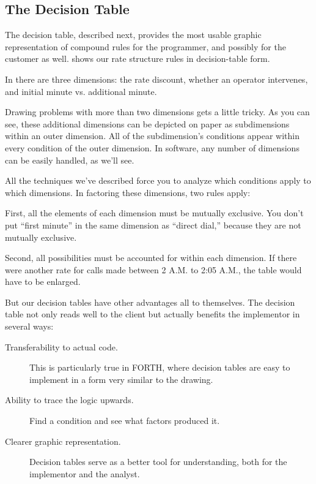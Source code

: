 
\subsection{The Decision Table}

The decision table, described next, provides the most usable graphic
representation of compound rules for the programmer, and possibly for
the customer as well.  shows our rate structure rules in
decision-table form.


In  there are three dimensions: the rate discount, whether
an operator intervenes, and initial minute vs. additional minute.

Drawing problems with more than two dimensions gets a little tricky.
As you can see, these additional dimensions can be depicted on
paper as subdimensions within an outer dimension. All of the
subdimension's conditions appear within every condition of the outer
dimension.  In software, any number of dimensions can be easily
handled, as we'll see.

All the techniques we've described force you to analyze which
conditions apply to which dimensions. In factoring these dimensions,
two rules apply:

First, all the elements of each dimension must be mutually exclusive.
You don't put ``first minute'' in the same dimension as ``direct
dial,'' because they are not mutually exclusive.

Second, all possibilities must be accounted for within each dimension.
If there were another rate for calls made between 2 A.M. to 2:05 A.M.,
the table would have to be enlarged.

But our decision tables have other advantages all to themselves.  The
decision table not only reads well to the client but actually benefits
the implementor in several ways:

\begin{description}
\item[Transferability to actual code.] This is particularly true in FORTH,
where decision tables are easy to implement in a form very similar to the
drawing.

\item[Ability to trace the logic upwards.] Find a condition and see what
factors produced it.

\item[Clearer graphic representation.] Decision tables serve as a better tool
for understanding, both for the implementor and the analyst.
\end{description}

